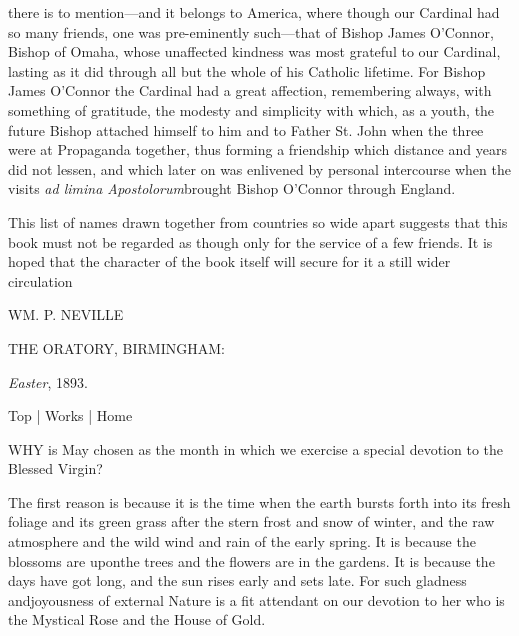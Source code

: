 there
is to mention—and it belongs to America, where though our
Cardinal had
so many friends, one was pre-eminently such—that of Bishop James
O'Connor, Bishop of Omaha, whose unaffected kindness was most
grateful
to our Cardinal, lasting as it did through all but the whole of
his
Catholic lifetime. For Bishop James O'Connor the Cardinal had a
great
affection, remembering always, with something of gratitude, the
modesty
and simplicity with which, as a youth, the future Bishop
attached
himself to him and to Father St. John when the three were at
Propaganda
together, thus forming a friendship which distance and years did
not
lessen, and which later on was enlivened by personal intercourse
when
the visits \emph{ad limina Apostolorum}brought Bishop O'Connor
through England.


This list of names drawn together from countries
so wide apart suggests that this book must not be regarded as though
only for the service of a few friends. It is hoped that the character of
the book itself will secure for it a still wider circulation


WM.
P. NEVILLE


THE ORATORY,
BIRMINGHAM:


\emph{Easter}, 1893.


Top | Works | Home















WHY
is May chosen as the month in which we exercise a special devotion to
the Blessed Virgin?

The first reason is because it
is the time when the earth bursts forth into its fresh foliage and its
green grass after the stern frost and snow of winter, and the raw
atmosphere and the wild wind and rain of the early spring. It is because
the blossoms are upon\emph{}the trees and the flowers are in the
gardens. It is because the days have got long, and the sun rises early
and sets late. For such gladness and\emph{}joyousness of external
Nature is a fit attendant on our devotion to her who is the Mystical
Rose and the House of Gold.

